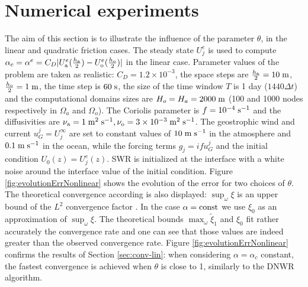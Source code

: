 \section{Numerical experiments}
\label{sec:num-exp}
The aim of this section is to illustrate the influence of the parameter $\theta$, in the linear and quadratic friction cases. 
The steady state $U_j^e$ is used to compute $\alpha_c = \alpha^e = C_D|U_{\rm a}^e(\frac{h_{\rm a}}{2}) - U_{\rm o}^e (\frac{h_{\rm o}}{2})|$ in the linear case.
Parameter values of the problem are taken as realistic:
$C_D = 1.2\times 10^{-3}$, the space steps are
$\frac{h_{\rm a}}{2} = 10\; {\rm m}$, $\frac{h_{\rm o}}{2} = 1 \;{\rm m}$,
the time step  is $60 \;{\rm s}$,
the size of the time window $T$ is 1 day ($1440\Delta t$) and the computational domains sizes are $H_o = H_a = 2000 \; {\rm m}$
(100 and 1000 nodes respectively in $\Omega_a$ and $\Omega_o$).
The Coriolis parameter is 
$f=10^{-4}\; {\rm s^{-1}}$ and the diffusivities are 
$\nu_{\rm a} = 1\; {\rm m^2}\;{\rm s}^{-1}, 
\nu_{\rm o} = 3\times 10^{-3} \;{\rm m^2}\;{\rm s}^{-1}$. 
The geostrophic wind and current $u_G^j = U_j^\infty$
are  set to constant values of $10\;{\rm m}\;{\rm s}^{-1}$ in the 
atmosphere and $0.1\;{\rm m}\;{\rm s}^{-1}$ in the ocean, while the forcing terms 
$g_j=i f u_G^j$ and the initial condition $U_0(z)=U_j^e(z)$.
SWR is 
initialized at the interface with a white noise around the interface value
of the initial condition.
Figure \ref{fig:evolutionErrNonlinear} shows the evolution of the error for two choices of $\theta$. The theoretical
convergence according is
also displayed: $\sup_\omega \xi$ is an upper bound of the $L^2$ convergence factor \cite{thery_etude_2021}. In the case
$\alpha={\rm const}$ we use $\xi_0$ as an approximation of
$\sup_\omega \xi$.
The theoretical bounds $\max_\omega \widetilde{\xi}_1$ and $\xi_0$
fit rather accurately the convergence rate and one can see that
those values are indeed greater than the observed convergence rate.
Figure \ref{fig:evolutionErrNonlinear} confirms the results of Section \ref{sec:conv-lin}:
when considering $\alpha=\alpha_c$ constant, the fastest convergence is achieved when $\theta$ is close to 1, similarly to the DNWR algorithm.
